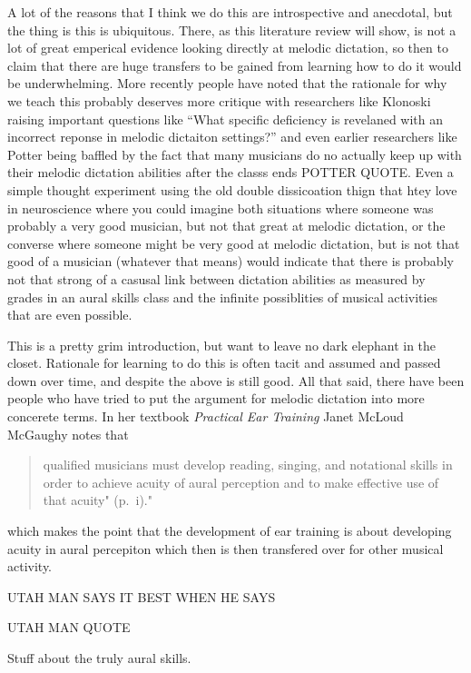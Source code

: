 \documentclass[]{book}
\theoremstyle{definition}
\theoremstyle{definition}
\theoremstyle{definition}
\theoremstyle{remark}
\begin{document}
A lot of the reasons that I think we do this are introspective and
anecdotal, but the thing is this is ubiquitous. There, as this
literature review will show, is not a lot of great emperical evidence
looking directly at melodic dictation, so then to claim that there are
huge transfers to be gained from learning how to do it would be
underwhelming. More recently people have noted that the rationale for
why we teach this probably deserves more critique with researchers like
Klonoski raising important questions like ``What specific deficiency is
revelaned with an incorrect reponse in melodic dictaiton settings?''
\citep{klonoskiImprovingDictationAuralSkills2006} and even earlier
researchers like Potter being baffled by the fact that many musicians do
no actually keep up with their melodic dictation abilities after the
classs ends POTTER QUOTE. Even a simple thought experiment using the old
double dissicoation thign that htey love in neuroscience where you could
imagine both situations where someone was probably a very good musician,
but not that great at melodic dictation, or the converse where someone
might be very good at melodic dictation, but is not that good of a
musician (whatever that means) would indicate that there is probably not
that strong of a casusal link between dictation abilities as measured by
grades in an aural skills class and the infinite possiblities of musical
activities that are even possible.

This is a pretty grim introduction, but want to leave no dark elephant
in the closet. Rationale for learning to do this is often tacit and
assumed and passed down over time, and despite the above is still good.
All that said, there have been people who have tried to put the argument
for melodic dictation into more concerete terms. In her textbook
\emph{Practical Ear Training} Janet McLoud McGaughy notes that

\begin{quote}
qualified musicians must develop reading, singing, and notational skills
in order to achieve acuity of aural perception and to make effective use
of that acuity" (p.~i)."
\end{quote}

which makes the point that the development of ear training is about
developing acuity in aural percepiton which then is then transfered over
for other musical activity.

UTAH MAN SAYS IT BEST WHEN HE SAYS

UTAH MAN QUOTE

Stuff about the truly aural skills.
\end{document}
